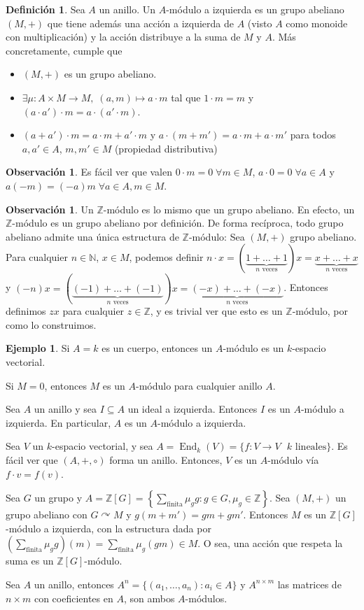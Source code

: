 \documentclass[12pt]{book}
\theoremstyle{definition}
\newtheorem{obs}[teo]{Observación}
\newtheorem{defn}[teo]{Definición}
\newtheorem{ex}[teo]{Ejemplo}
\newcommand{\ZZ}{\mathbb{Z}}      %
\newcommand{\NN}{\mathbb{N}}
\DeclareMathOperator{\End}{End}
\def\acts{\curvearrowright}
\begin{document}
\begin{defn}
Sea $A$ un anillo. Un $A$-módulo a izquierda es un grupo abeliano $(M,+)$ que tiene además una acción a izquierda de $A$ (visto $A$ como monoide con multiplicación) y la acción distribuye a la suma de $M$ y $A$. Más concretamente, cumple que \begin{itemize}\item $(M,+)$ es un grupo abeliano. \item $\exists\mu :A\times M \to M, \; (a,m)\mapsto a\cdot m$ tal que $1\cdot m = m$ y $(a\cdot a') \cdot m = a\cdot (a'\cdot m)$. \item $(a+a')\cdot m = a\cdot m + a'\cdot m$ y $a\cdot (m+m') = a\cdot m + a\cdot m'$ para todos $a,a'\in A$, $m,m'\in M$ (propiedad distributiva)\end{itemize}
\end{defn}
\begin{obs}
Es fácil ver que valen $0\cdot m = 0\;\forall m\in M$, $a\cdot 0 = 0 \;\forall a\in A$ y $a(-m) = (-a)m \; \forall a\in A, m\in M$.
\end{obs}

\begin{obs}
Un $\ZZ$-módulo es lo mismo que un grupo abeliano. En efecto, un $\ZZ$-módulo es un grupo abeliano por definición. De forma recíproca, todo grupo abeliano admite una única estructura de $\ZZ$-módulo: Sea $(M,+)$ grupo abeliano. Para cualquier $n\in\NN$, $x\in M$, podemos definir $n\cdot x = (\underbrace{1+\ldots + 1}_{n\text{ veces}})x = \underbrace{x+\ldots + x}_{n\text{ veces}}$ y $(-n)x = (\underbrace{(-1)+\ldots + (-1)}_{n\text{ veces}})x = \underbrace{(-x)+\ldots + (-x)}_{n\text{ veces}}$. Entonces definimos $zx$ para cualquier $z\in\ZZ$, y es trivial ver que esto es un $\ZZ$-módulo, por como lo construimos.
\end{obs}

\begin{ex}
Si $A=k$ es un cuerpo, entonces un $A$-módulo es un $k$-espacio vectorial.

Si $M=0$, entonces $M$ es un $A$-módulo para cualquier anillo $A$.

Sea $A$ un anillo y sea $I\subseteq A$ un ideal a izquierda. Entonces $I$ es un $A$-módulo a izquierda. En particular, $A$ es un $A$-módulo a izquierda.

Sea $V$ un $k$-espacio vectorial, y sea $A=\End_k(V) = \{f:V\to V \text{ } k \text{ lineales}\}$. Es fácil ver que $(A,+,\circ)$ forma un anillo. Entonces, $V$ es un $A$-módulo vía $f\cdot v = f(v)$.

Sea $G$ un grupo y $A=\ZZ[G] = \left\{ \displaystyle\sum_{\text{finita}} \mu_g g : g\in G, \mu_g\in\ZZ\right\}$. Sea $(M,+)$ un grupo abeliano con $G\acts M$ y $g(m+m') = gm + gm'$. Entonces $M$ es un $\ZZ[G]$-módulo a izquierda, con la estructura dada por $\left( \displaystyle\sum_{\text{finita}} \mu_g g\right) (m) = \displaystyle\sum_{\text{finita}} \mu_g (gm) \in M$. O sea, una acción que respeta la suma es un $\ZZ[G]$-módulo.

Sea $A$ un anillo, entonces $A^n = \{(a_1,\ldots , a_n) : a_i\in A\}$ y $A^{n\times m}$ las matrices de $n\times m$ con coeficientes en $A$, son ambos $A$-módulos.
\end{ex}
\end{document}
